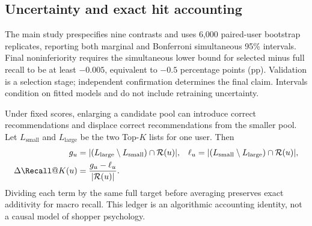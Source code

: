 \subsection{Uncertainty and exact hit accounting}
The main study prespecifies nine contrasts and uses 6,000 paired-user bootstrap replicates, reporting both marginal and Bonferroni simultaneous 95\% intervals. Final noninferiority requires the simultaneous lower bound for selected minus full recall to be at least $-0.005$, equivalent to $-0.5$ percentage points (pp). Validation is a selection stage; independent confirmation determines the final claim. Intervals condition on fitted models and do not include retraining uncertainty.

Under fixed scores, enlarging a candidate pool can introduce correct recommendations and displace correct recommendations from the smaller pool. Let $L_{\mathrm{small}}$ and $L_{\mathrm{large}}$ be the two Top-$K$ lists for one user. Then
\begin{align}
 g_u&=|(L_{\mathrm{large}}\setminus L_{\mathrm{small}})\cap\R(u)|, &
 \ell_u&=|(L_{\mathrm{small}}\setminus L_{\mathrm{large}})\cap\R(u)|,\nonumber\\
 \Delta\Recall@K(u)&=\frac{g_u-\ell_u}{|\R(u)|}.
 \label{eq:ledger}
\end{align}
Dividing each term by the same full target before averaging preserves exact additivity for macro recall. This ledger is an algorithmic accounting identity, not a causal model of shopper psychology.

